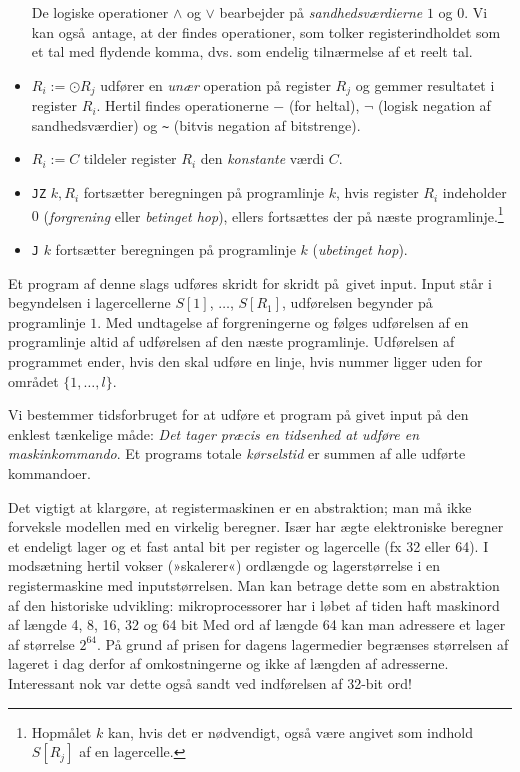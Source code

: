 \begin{itemize}
    De logiske operationer $\wedge$ og $\vee$ bearbejder på \emph{sandhedsværdierne} $1$ og $0$.
    Vi kan også antage, at der findes operationer, som tolker registerindholdet som et tal med flydende komma, dvs. som endelig tilnærmelse af et reelt tal.
  \item $R_i:=\odot R_j$ udfører en \emph{unær} operation
    på register $R_j$ og gemmer resultatet i register $R_i$.
    Hertil findes operationerne $-$ (for heltal), $\neg$ (logisk negation af sandhedsværdier) og \texttt{\~} (bitvis negation af bitstrenge).
  \item $R_i:= C$ tildeler register $R_i$ den \emph{konstante}
    værdi $C$.
  \item  \texttt{JZ} $k, R_i$ fortsætter beregningen på programlinje $k$, hvis register $R_i$ indeholder $0$ (\emph{forgrening}
    eller \emph{betinget hop}),
    ellers fortsættes der på næste programlinje.\footnote{%
      Hopmålet $k$ kan, hvis det er nødvendigt, også være angivet som indhold $S[R_j]$ af en lagercelle.}
    \item \texttt{J} $k$ fortsætter beregningen på programlinje $k$ (\emph{ubetinget hop}).
\end{itemize}

Et program af denne slags udføres skridt for skridt på givet input.
Input står i begyndelsen i lagercellerne $S[1]$, $\ldots$, $S[R_1]$, udførelsen begynder på programlinje $1$.
Med undtagelse af forgreningerne  og  følges udførelsen af en programlinje altid af udførelsen af den næste programlinje.
Udførelsen af programmet ender, hvis den skal udføre en linje, hvis nummer ligger uden for området $\{1,\ldots,l\}$.

Vi bestemmer tidsforbruget for at udføre et program på givet input på den enklest tænkelige måde:
\emph{Det tager præcis en tidsenhed at udføre en maskinkommando}.
Et programs totale \emph{kørselstid} 
er summen af alle udførte kommandoer.

Det vigtigt at klargøre, at registermaskinen er en abstraktion; man må ikke forveksle modellen med en virkelig beregner.
Især har ægte elektroniske beregner
et endeligt lager og et fast antal bit per register og lagercelle (fx 32 eller 64).
I modsætning hertil vokser (»skalerer«) ordlængde og lagerstørrelse i en registermaskine med inputstørrelsen.
Man kan betrage dette som en abstraktion af den historiske udvikling: 
mikroprocessorer har i løbet af tiden haft maskinord af længde 4, 8, 16, 32 og 64 bit
Med ord af længde 64 kan man adressere et lager af størrelse $2^{64}$.
På grund af prisen for dagens lagermedier begrænses størrelsen af lageret i dag derfor af omkostningerne og ikke af længden af adresserne.
Interessant nok var dette også sandt ved indførelsen af 32-bit ord!


